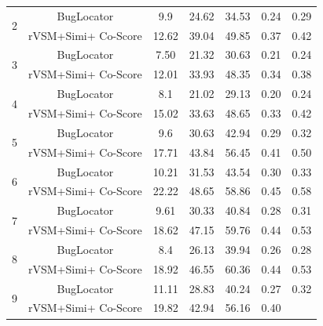 \documentclass{sig-alternate}
\begin{document}
\begin{table}[]
\begin{tabular}{@{}|c|c|c|c|c|c|c|@{}}
		\multirow{2}{*}{2}  &BugLocator     &  9.9& 24.62&34.53& 0.24 & 0.29 \\ 
		& rVSM+Simi+ Co-Score                                                                      & 12.62                                               & 39.04                                              & 49.85                                             &   0.37  &   0.42  \\ \midrule
		\multirow{2}{*}{3}  &BugLocator     &  7.50& 21.32&30.63& 0.21 & 0.24 \\ 
		& rVSM+Simi+ Co-Score                                                                     & 12.01                                            & 33.93                                            & 48.35                                             &   0.34  &  0.38   \\ \midrule
	\multirow{2}{*}{4}  &BugLocator     &  8.1& 21.02&29.13& 0.20 & 0.24 \\ 
	& rVSM+Simi+ Co-Score                                                                    & 15.02                       & 33.63                       & 48.65                                               &  0.33   &  0.42  \\ \midrule 
	\multirow{2}{*}{5}  &BugLocator     &  9.6& 30.63&42.94& 0.29 & 0.32 \\ 
	& rVSM+Simi+ Co-Score                                                                    & 17.71                                                 & 43.84                                                & 56.45                                                  &  0.41   & 0.50     \\ \midrule
	\multirow{2}{*}{6}  &BugLocator     &  10.21& 31.53&43.54& 0.30 & 0.33 \\ 
	& rVSM+Simi+ Co-Score
		&22.22 &
		48.65 &
		58.86 & 0.45 &
		0.58     \\  \midrule
		\multirow{2}{*}{7}  &BugLocator     &  9.61& 30.33&40.84& 0.28 & 0.31 \\ 
		& rVSM+Simi+ Co-Score
		&18.62 &
		47.15 &
		59.76 & 0.44 &
		0.53     \\  \midrule
	\multirow{2}{*}{8}  &BugLocator     &  8.4& 26.13&39.94& 0.26 & 0.28 \\ 
	& rVSM+Simi+ Co-Score
		&18.92 &
		46.55 &
		60.36 & 0.44 &
		0.53    \\  \midrule
	\multirow{2}{*}{9}  &BugLocator     &  11.11& 28.83&40.24& 0.27 & 0.32 \\ 
	& rVSM+Simi+ Co-Score
		&19.82 &
		42.94 &
		56.16 & 0.40 &

\end{tabular}
\end{table}
\end{document}
